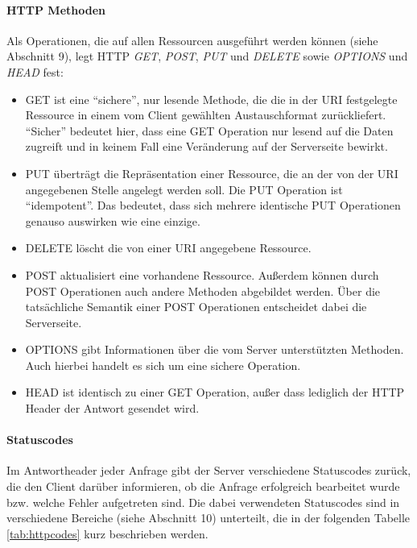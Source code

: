 \paragraph{HTTP Methoden}
Als Operationen, die auf allen Ressourcen ausgeführt werden können (siehe
\cite{rfc2616} Abschnitt 9), legt \ac{HTTP} \emph{GET},
\emph{POST}, \emph{PUT} und \emph{DELETE} sowie \emph{OPTIONS} und \emph{HEAD}
fest:

\begin{itemize}
  \item GET ist eine "`sichere"', nur lesende Methode,
  die die in der \ac{URI} festgelegte Ressource in einem vom Client gewählten Austauschformat
  zurückliefert. "`Sicher"' bedeutet hier, dass eine GET Operation nur lesend
  auf die Daten zugreift und in keinem Fall eine Veränderung auf der Serverseite
  bewirkt.
  \item PUT überträgt die Repräsentation einer Ressource, die an der von
  der \ac{URI} angegebenen Stelle angelegt werden soll. Die PUT
  Operation ist "`idempotent"'. Das bedeutet, dass sich mehrere identische PUT
  Operationen genauso auswirken wie eine einzige.
  \item DELETE löscht die von einer \ac{URI} angegebene Ressource.
  \item POST aktualisiert eine vorhandene Ressource. Außerdem können durch POST
  Operationen auch andere Methoden abgebildet werden. Über die tatsächliche
  Semantik einer POST Operationen entscheidet dabei die Serverseite.
  \item OPTIONS gibt Informationen über die vom Server unterstützten Methoden.
  Auch hierbei handelt es sich um eine sichere Operation.
  \item HEAD ist identisch zu einer GET Operation, außer dass lediglich der 
  \ac{HTTP} Header der Antwort gesendet wird.
\end{itemize}

\paragraph{Statuscodes}
Im Antwortheader jeder Anfrage gibt der Server verschiedene Statuscodes zurück,
die den Client darüber informieren, ob die Anfrage erfolgreich bearbeitet wurde
bzw. welche Fehler aufgetreten sind. Die dabei verwendeten Statuscodes sind in
verschiedene Bereiche (siehe \cite{rfc2616} Abschnitt 10) unterteilt, die in der
folgenden Tabelle \ref{tab:httpcodes} kurz beschrieben werden.

